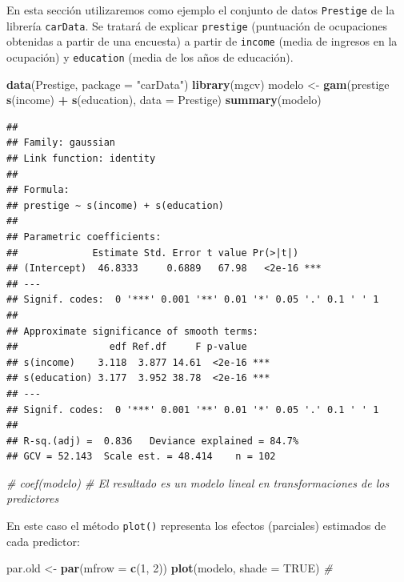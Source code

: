 \documentclass[
  spanish,
]{book}
\newenvironment{Shaded}{\begin{snugshade}}{\end{snugshade}}
\newcommand{\CommentTok}[1]{\textcolor[rgb]{0.56,0.35,0.01}{\textit{#1}}}
\newcommand{\DataTypeTok}[1]{\textcolor[rgb]{0.13,0.29,0.53}{#1}}
\newcommand{\DecValTok}[1]{\textcolor[rgb]{0.00,0.00,0.81}{#1}}
\newcommand{\KeywordTok}[1]{\textcolor[rgb]{0.13,0.29,0.53}{\textbf{#1}}}
\newcommand{\NormalTok}[1]{#1}
\newcommand{\OperatorTok}[1]{\textcolor[rgb]{0.81,0.36,0.00}{\textbf{#1}}}
\newcommand{\OtherTok}[1]{\textcolor[rgb]{0.56,0.35,0.01}{#1}}
\newcommand{\StringTok}[1]{\textcolor[rgb]{0.31,0.60,0.02}{#1}}
\theoremstyle{break}
\theoremstyle{definition}
\theoremstyle{definition}
\theoremstyle{definition}
\theoremstyle{remark}
\begin{document}
En esta sección utilizaremos como ejemplo el conjunto de datos \texttt{Prestige} de la librería \texttt{carData}.
Se tratará de explicar \texttt{prestige} (puntuación de ocupaciones obtenidas a partir de una encuesta) a partir de \texttt{income} (media de ingresos en la ocupación) y \texttt{education} (media de los años de educación).

\begin{Shaded}
\begin{Highlighting}[]
\KeywordTok{data}\NormalTok{(Prestige, }\DataTypeTok{package =} \StringTok{"carData"}\NormalTok{)}
\KeywordTok{library}\NormalTok{(mgcv)}
\NormalTok{modelo <-}\StringTok{ }\KeywordTok{gam}\NormalTok{(prestige }\OperatorTok{~}\StringTok{ }\KeywordTok{s}\NormalTok{(income) }\OperatorTok{+}\StringTok{ }\KeywordTok{s}\NormalTok{(education), }\DataTypeTok{data =}\NormalTok{ Prestige)}
\KeywordTok{summary}\NormalTok{(modelo)}
\end{Highlighting}
\end{Shaded}

\begin{verbatim}
## 
## Family: gaussian 
## Link function: identity 
## 
## Formula:
## prestige ~ s(income) + s(education)
## 
## Parametric coefficients:
##             Estimate Std. Error t value Pr(>|t|)    
## (Intercept)  46.8333     0.6889   67.98   <2e-16 ***
## ---
## Signif. codes:  0 '***' 0.001 '**' 0.01 '*' 0.05 '.' 0.1 ' ' 1
## 
## Approximate significance of smooth terms:
##                edf Ref.df     F p-value    
## s(income)    3.118  3.877 14.61  <2e-16 ***
## s(education) 3.177  3.952 38.78  <2e-16 ***
## ---
## Signif. codes:  0 '***' 0.001 '**' 0.01 '*' 0.05 '.' 0.1 ' ' 1
## 
## R-sq.(adj) =  0.836   Deviance explained = 84.7%
## GCV = 52.143  Scale est. = 48.414    n = 102
\end{verbatim}

\begin{Shaded}
\begin{Highlighting}[]
\CommentTok{# coef(modelo) # El resultado es un modelo lineal en transformaciones de los predictores}
\end{Highlighting}
\end{Shaded}

En este caso el método \texttt{plot()} representa los efectos (parciales) estimados de cada predictor:

\begin{Shaded}
\begin{Highlighting}[]
\NormalTok{par.old <-}\StringTok{ }\KeywordTok{par}\NormalTok{(}\DataTypeTok{mfrow =} \KeywordTok{c}\NormalTok{(}\DecValTok{1}\NormalTok{, }\DecValTok{2}\NormalTok{))}
\KeywordTok{plot}\NormalTok{(modelo, }\DataTypeTok{shade =} \OtherTok{TRUE}\NormalTok{) }\CommentTok{# }
\end{Highlighting}
\end{Shaded}
\end{document}

